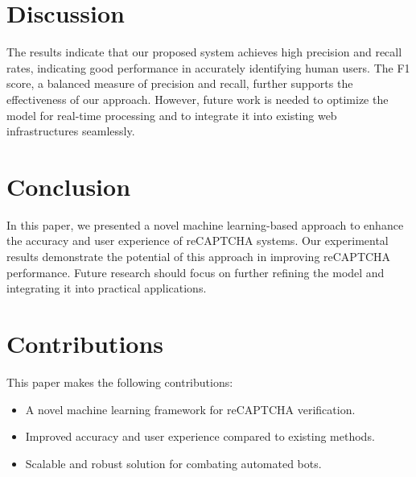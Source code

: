 \documentclass{article}
\begin{document}
\section{Discussion}
The results indicate that our proposed system achieves high precision and recall rates, indicating good performance in accurately identifying human users. The F1 score, a balanced measure of precision and recall, further supports the effectiveness of our approach. However, future work is needed to optimize the model for real-time processing and to integrate it into existing web infrastructures seamlessly.

\section{Conclusion}
In this paper, we presented a novel machine learning-based approach to enhance the accuracy and user experience of reCAPTCHA systems. Our experimental results demonstrate the potential of this approach in improving reCAPTCHA performance. Future research should focus on further refining the model and integrating it into practical applications.

\section{Contributions}
This paper makes the following contributions:
\begin{itemize}
    \item A novel machine learning framework for reCAPTCHA verification.
    \item Improved accuracy and user experience compared to existing methods.
    \item Scalable and robust solution for combating automated bots.
\end{itemize}



\end{document}
